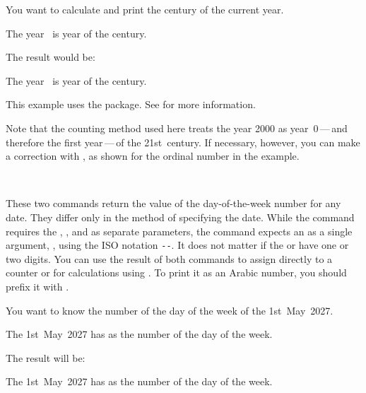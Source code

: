 \begin{Example}
  You want to calculate and print the century of the current year.
\begin{lstcode}
  The year \the\year\ is year \the\DecadePart{\year}
  of the \engord{\numexpr\CenturyPart{\year}+1\relax} century.
\end{lstcode}
  The result would be:
  \begin{ShowOutput}
    The year \the\year\ is year \the\DecadePart{\year}
    of the \engordnumber{\numexpr\CenturyPart{\year}+1\relax} century.
  \end{ShowOutput}
  This example uses the  package.
  See \cite{package:engord} for more information.
\end{Example}

Note that the counting method used here treats the year
2000 as year~0\,---\,and therefore the first year\,---\,of the 21st~century.
If necessary, however, you can make a correction with , as
shown for the ordinal number in the example.%
\EndIndexGroup


\begin{Declaration}
  \\%
\end{Declaration}%
These two commands return the value of
the day-of-the-week number for any date. They differ
only in the method of specifying the date. While the  command
requires the , , and  as separate
parameters, the  command expects an  as a
single argument, , using the ISO notation
\texttt{-}\texttt{-}. It does not matter
if the  or  have one or two digits. You can use the
result of both commands to assign directly to a counter or for calculations
using . To print it as
an Arabic number, you should prefix it with .

\begin{Example}
  You want to know the number of the day of the week of the 1st~May~2027.
\begin{lstcode}
  The 1st~May~2027 has \the{}
  as the number of the day of the week.
\end{lstcode}
  The result will be:
  \begin{ShowOutput}
    The 1st~May~2027 has \the{}
    as the number of the day of the week.
  \end{ShowOutput}
\end{Example}

